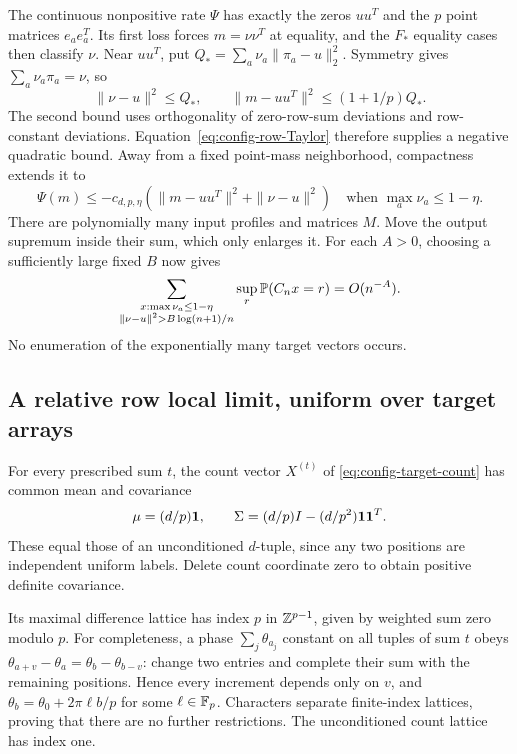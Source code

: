 The continuous nonpositive rate $\Psi$ has exactly the zeros
$u u^T$ and the $p$ point matrices $e_ae_a^T$.
Its first loss forces $m=\nu\nu^T$ at equality, and the $F_*$
equality cases then classify $\nu$. Near $u u^T$, put
$Q_*=\sum_a\nu_a\|\pi_a-u\|_2^2$.
Symmetry gives $\sum_a\nu_a\pi_a=\nu$, so
\[
 \|\nu-u\|^2\le Q_*,\qquad
 \|m-u u^T\|^2\le(1+1/p)Q_*.
\]
The second bound uses orthogonality of zero-row-sum deviations and
row-constant deviations. Equation~\eqref{eq:config-row-Taylor}
therefore supplies a negative quadratic bound. Away from a fixed
point-mass neighborhood, compactness extends it to
\[
 \Psi(m)\le-c_{d,p,\eta}
       (\|m-u u^T\|^2+\|\nu-u\|^2)
 \quad\text{when }\max_a\nu_a\le1-\eta.
\]
There are polynomially many input profiles and matrices $M$.
Move the output supremum inside their sum, which only enlarges it.
For each $A>0$, choosing a sufficiently large fixed $B$ now gives
\begin{equation}\label{eq:config-middle}
 \sum_{\substack{x:\max\nu_a\le1-\eta\\
          \|\nu-u\|^2>B\log(n+1)/n}}
       \sup_r\mathbb P(C_nx=r)=O(n^{-A}).
\end{equation}
No enumeration of the exponentially many target vectors occurs.

\subsection{A relative row local limit, uniform over target arrays}
For every prescribed sum $t$, the count vector $X^{(t)}$ of
\eqref{eq:config-target-count} has common mean and covariance
\begin{equation}\label{eq:config-row-cov}
 \mu=(d/p)\mathbf 1,\qquad\Sigma=(d/p)I-(d/p^2)\mathbf 1\mathbf 1^T.
\end{equation}
These equal those of an unconditioned $d$-tuple, since any two
positions are independent uniform labels. Delete count coordinate
zero to obtain positive definite covariance.

Its maximal difference lattice has index $p$ in $\mathbb Z^{p-1}$,
given by weighted sum zero modulo $p$. For completeness, a phase
$\sum_j\theta_{a_j}$ constant on all tuples of sum $t$ obeys
$\theta_{a+v}-\theta_a=\theta_b-\theta_{b-v}$: change two entries
and complete their sum with the remaining positions. Hence every
increment depends only on $v$, and
$\theta_b=\theta_0+2\pi\ell b/p$ for some $\ell\in\mathbb F_p$.
Characters separate finite-index lattices, proving that there are
no further restrictions. The unconditioned count lattice has index one.

